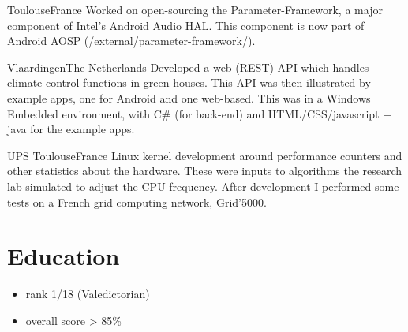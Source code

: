 \documentclass[a4paper,11pt,sans]{moderncv}
\begin{document}
{Toulouse}{France}
{
  Worked on open-sourcing the Parameter-Framework, a major component of Intel's Android Audio HAL.
  This component is now part of Android AOSP (/external/parameter-framework/).
}

{Vlaardingen}{The Netherlands}
{
  Developed a web (REST) API which handles climate control functions in green-houses.
  This API was then illustrated by example apps, one for Android and one web-based.
  This was in a Windows Embedded environment, with C\# (for back-end) and HTML/CSS/javascript + java for the example apps.
}

{UPS Toulouse}{France}
{
  Linux kernel development around performance counters and other statistics about the hardware.
  These were inputs to algorithms the research lab simulated to adjust the CPU frequency.
  After development I performed some tests on a French grid computing network, Grid'5000.
}


\section{Education}
{
  \begin{itemize}
  \item rank 1/18 (Valedictorian)
  \item overall score > 85\%
  \end{itemize}
}
\end{document}
